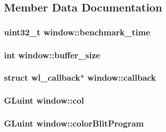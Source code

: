 \subsection{Member Data Documentation}
\hypertarget{structwindow_a72629bf021a361ad900504732a74cb68}{
\subsubsection[{benchmark\-\_\-time}]{\setlength{\rightskip}{0pt plus 5cm}uint32\-\_\-t window\-::benchmark\-\_\-time}}\label{structwindow_a72629bf021a361ad900504732a74cb68}
\hypertarget{structwindow_a0e634038f669aff472012f25ea250b40}{
\subsubsection[{buffer\-\_\-size}]{\setlength{\rightskip}{0pt plus 5cm}int window\-::buffer\-\_\-size}}\label{structwindow_a0e634038f669aff472012f25ea250b40}
\hypertarget{structwindow_a35ba639556fa19d9273dad0953a6807e}{
\subsubsection[{callback}]{\setlength{\rightskip}{0pt plus 5cm}struct wl\-\_\-callback$\ast$ window\-::callback}}\label{structwindow_a35ba639556fa19d9273dad0953a6807e}
\hypertarget{structwindow_aef10fe94766ccd4831ee611c5ad0e55c}{
\subsubsection[{col}]{\setlength{\rightskip}{0pt plus 5cm}G\-Luint window\-::col}}\label{structwindow_aef10fe94766ccd4831ee611c5ad0e55c}
\hypertarget{structwindow_afcddaf6e638b4372072dbcb758cadc3d}{
\subsubsection[{color\-Blit\-Program}]{\setlength{\rightskip}{0pt plus 5cm}G\-Luint window\-::color\-Blit\-Program}}\label{structwindow_afcddaf6e638b4372072dbcb758cadc3d}
